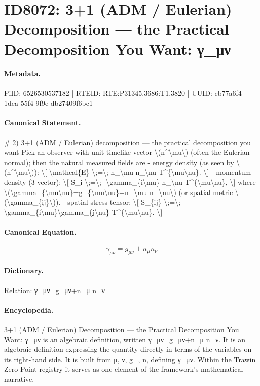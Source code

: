 \section*{ID8072: 3+1 (ADM / Eulerian) Decomposition — the Practical Decomposition You Want: γ\_μν}
\paragraph{Metadata.}
PiID: 6526530537182 | RTEID: RTE:P31345.3686:T1.3820 | UUID: cb77a6f4-1dea-55f4-9f9e-db27409f6bc1

\paragraph{Canonical Statement.}
\# 2) 3+1 (ADM / Eulerian) decomposition — the practical decomposition you want Pick an observer with unit timelike vector \textbackslash{}(n\textasciicircum{}\textbackslash{}mu\textbackslash{}) (often the Eulerian normal); then the natural measured fields are - energy density (as seen by \textbackslash{}(n\textasciicircum{}\textbackslash{}mu\textbackslash{})): \textbackslash{}[ \textbackslash{}mathcal\{E\} \textbackslash{};=\textbackslash{}; n\_\textbackslash{}mu n\_\textbackslash{}nu T\textasciicircum{}\{\textbackslash{}mu\textbackslash{}nu\}. \textbackslash{}] - momentum density (3-vector): \textbackslash{}[ S\_i \textbackslash{};=\textbackslash{}; -\textbackslash{}gamma\_\{i\textbackslash{}mu\} n\_\textbackslash{}nu T\textasciicircum{}\{\textbackslash{}mu\textbackslash{}nu\}, \textbackslash{}] where \textbackslash{}(\textbackslash{}gamma\_\{\textbackslash{}mu\textbackslash{}nu\}=g\_\{\textbackslash{}mu\textbackslash{}nu\}+n\_\textbackslash{}mu n\_\textbackslash{}nu\textbackslash{}) (or spatial metric \textbackslash{}(\textbackslash{}gamma\_\{ij\}\textbackslash{})). - spatial stress tensor: \textbackslash{}[ S\_\{ij\} \textbackslash{};=\textbackslash{}; \textbackslash{}gamma\_\{i\textbackslash{}mu\}\textbackslash{}gamma\_\{j\textbackslash{}nu\} T\textasciicircum{}\{\textbackslash{}mu\textbackslash{}nu\}. \textbackslash{}]

\paragraph{Canonical Equation.}
\[
\gamma_{\mu\nu}=g_{\mu\nu}+n_\mu n_\nu
\]

\paragraph{Dictionary.}
Relation: γ\_μν=g\_μν+n\_μ n\_ν

\paragraph{Encyclopedia.}
3+1 (ADM / Eulerian) Decomposition — the Practical Decomposition You Want: γ\_μν is an algebraic definition, written γ\_μν=g\_μν+n\_μ n\_ν. It is an algebraic definition expressing the quantity directly in terms of the variables on its right-hand side. It is built from μ, ν, g\_, n, defining γ\_μν. Within the Trawin Zero Point registry it serves as one element of the framework's mathematical narrative.
